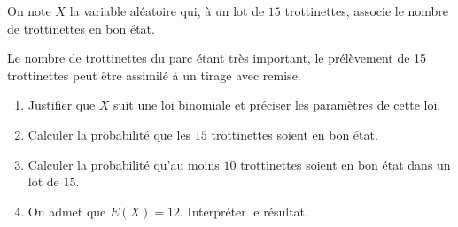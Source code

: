 \documentclass[10pt]{article}
\begin{document}
On note $X$ la variable aléatoire qui, à un lot de $15$ trottinettes, associe le nombre de trottinettes en bon état.

Le nombre de trottinettes du parc étant très important, le prélèvement de 15 trottinettes peut être assimilé à un tirage avec remise.

\medskip

\begin{enumerate}
\item Justifier que $X$ suit une loi binomiale et préciser les paramètres de cette loi.
\item Calculer la probabilité que les $15$ trottinettes soient en bon état.
\item Calculer la probabilité qu'au moins $10$ trottinettes soient en bon état dans un
lot de $15$.
\item On admet que $E(X) = 12$. Interpréter le résultat.
\end{enumerate}
\end{document}

